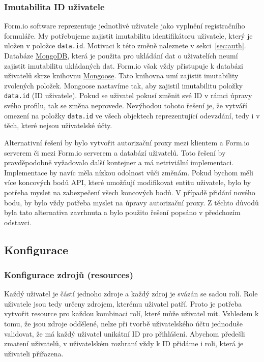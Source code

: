 \subsubsection{Imutabilita ID uživatele}\label{subsubsec:imutabilita-id-uzivatele}

Form.io software reprezentuje jednotlivé uživatele jako vyplnění registračního formuláře.
My potřebujeme zajistit imutabilitu identifikátoru uživatele, který je uložen v položce \texttt{data.id}.
Motivaci k této změně naleznete v sekci~\ref{sec:auth}.
Databáze \href{https://www.mongodb.com/}{MongoDB}, která je použita pro ukládání dat o uživatelích neumí zajistit imutabilitu ukládaných dat.
Form.io však vždy přistupuje k databázi uživatelů skrze knihovnu \href{https://mongoosejs.com/}{Mongoose}.
Tato knihovna umí zajistit imutability zvolených položek.
Mongoose nastavíme tak, aby zajistil imutabilitu položky \texttt{data.id} (ID uživatele).
Pokud se uživatel pokusí změnit své ID v rámci úpravy svého profilu, tak se změna neprovede.
Nevýhodou tohoto řešení je, že vytváří omezení na položky \texttt{data.id} ve všech objektech reprezentující odevzdání, tedy i v těch, které nejsou uživatelské účty.

Alternativní řešení by bylo vytvořit autorizační proxy mezi klientem a Form.io serverem či mezi Form.io serverem a databází uživatelů.
Toto řešení by pravděpodobně vyžadovalo další kontejner a má netriviální implementaci.
Implementace by navíc měla nízkou odolnost vůči změnám.
Pokud bychom měli více koncových bodů API, které umožňují modifikovat entitu uživatele, bylo by potřeba myslet na zabezpečení všech koncových bodů.
V případě přidání nového bodu, by bylo vždy potřeba myslet na úpravy autorizační proxy.
Z těchto důvodů byla tato alternativa zavrhnuta a bylo použito řešení popsáno v předchozím odstavci.

\subsection{Konfigurace}\label{subsec:konfigurace}

\subsubsection{Konfigurace zdrojů (resources)}\label{subsubsec:konfigurace-resources}

Každý uživatel je částí jednoho zdroje a každý zdroj je svázán se sadou rolí.
Role uživatele jsou tedy určeny zdrojem, kterému uživatel patří.
Proto je potřeba vytvořit resource pro každou kombinaci rolí, které může uživatel mít.
Vzhledem k tomu, že jsou zdroje oddělené, nelze při tvorbě uživatelského účtu jednoduše validovat, že má každý uživatel unikátní ID pro přihlášení.
Abychom předešli zmatení uživatelů, v uživatelském rozhraní vždy k ID přidáme i roli, která je uživateli přiřazena.

